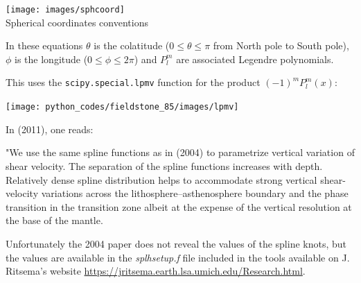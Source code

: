 \begin{center}
\texttt{[image: images/sphcoord]}\\
{\captionfont Spherical coordinates conventions}
\end{center}

In these equations $\theta$ is the colatitude ($0\le\theta\le \pi$ from North pole to South pole), $\phi$
is the longitude ($0\le\phi\le 2\pi$) and $P_l^m$ are associated Legendre polynomials. 

This \stone uses the {\tt scipy.special.lpmv} function for the product $(-1)^m P_l^m(x)$:
\begin{center}
\texttt{[image: python\_codes/fieldstone\_85/images/lpmv]}
\end{center}

In \textcite{ridv11} (2011), one reads: 
\begin{displayquote}
{\color{darkgray}
"We use the same 
spline functions as in \textcite{rivw04} (2004) to parametrize vertical 
variation of shear velocity. The separation of the spline functions
increases with depth. Relatively dense spline distribution helps to
accommodate strong vertical shear-velocity variations across the
lithosphere–asthenosphere boundary and the phase transition in the
transition zone albeit at the expense of the vertical resolution at
the base of the mantle.}
\end{displayquote}
Unfortunately the 2004 paper does not reveal the values of the spline knots, but the values
are available in the {\sl splhsetup.f} file included in the tools available 
on J. Ritsema's website \url{https://jritsema.earth.lsa.umich.edu/Research.html}.

